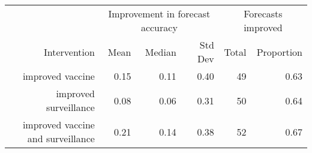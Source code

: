 
\begin{tabular*}{1.0\textwidth}{rrrrrr}
\toprule
             & \multicolumn{3}{c}{Improvement in forecast accuracy} & \multicolumn{2}{c}{Forecasts improved} \\
Intervention & Mean & Median & Std Dev & Total & Proportion \\
\midrule

improved vaccine & 0.15 & 0.11 & 0.40 & 49 & 0.63 \\
improved surveillance & 0.08 & 0.06 & 0.31 & 50 & 0.64 \\
improved vaccine and surveillance & 0.21 & 0.14 & 0.38 & 52 & 0.67 \\

\bottomrule
\end{tabular*}

